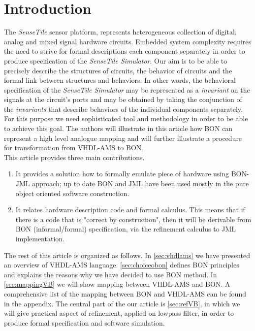 \documentclass{article}
\newcommand{\ST}{\emph{SenseTile}\xspace}
\newcommand{\STS}{\emph{SenseTile Simulator}\xspace}
\newcommand{\inv}{\emph{invariant}\xspace}
\begin{document}
\section{Introduction}
\label{sec:introduction}
The \ST sensor platform, represents heterogeneous collection of digital, analog
and mixed signal hardware circuits. Embedded system complexity
requires the need to strive for formal descriptions each component
separately in order to produce specification of the \STS.
Our aim is to be able to precisely describe the structures of circuits,
the behavior of circuits and the formal link between structures and behaviors.
In other words, the behavioral specification of the \STS may be
represented as a \inv on the signals at the circuit's ports and may be obtained
by taking the conjunction of the \emph{invariants} that describe
behaviors of the individual components separately.
For this purpose we need  sophisticated tool and methodology
in order to be able to achieve this goal. 
The authors will illustrate in this article how BON can represent a high
level analogue mapping and will further illustrate a procedure for
transformation from VHDL-AMS to BON.\\
This article provides three main contributions.
\begin{enumerate}
\item
 It provides a solution how to formally emulate
 piece of hardware using BON-JML approach; up to date BON and JML
 have been used mostly in the pure object oriented software construction.   
\item
It relates hardware description code and formal calculus.
This means that if there  is a code that is "correct by construction",
then it will be derivable from BON (informal/formal) specification,
via the refinement calculus to JML implementation.
\end{enumerate}
The rest of this article is organized as follows.
In \autoref{sec:vhdlams} we have  presented an overview of VHDL-AMS language.
\autoref{sec:choiceobon} defines  BON principles and explains the
reasons why we have decided to use BON method.
In \autoref{sec:mappingVB} we will show mapping between VHDL-AMS and BON.
A comprehensive list of the mapping between BON and VHDL-AMS can be
found in the appendix. 
The central part of the our article is \autoref{sec:refVB}, in which
we will give practical aspect of refinement, applied on lowpass filter, 
in order to produce formal specification and software simulation.\\ 
\end{document}
